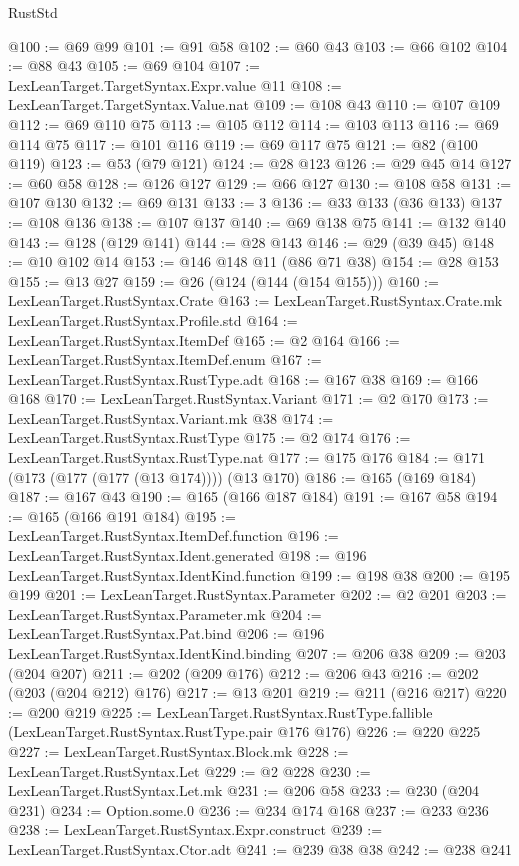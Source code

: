 \begin{lexlean}{RustStd}
\begin{coremodule}
@100 := @69 @99
@101 := @91 @58
@102 := @60 @43
@103 := @66 @102
@104 := @88 @43
@105 := @69 @104
@107 := LexLeanTarget.TargetSyntax.Expr.value @11
@108 := LexLeanTarget.TargetSyntax.Value.nat
@109 := @108 @43
@110 := @107 @109
@112 := @69 @110 @75
@113 := @105 @112
@114 := @103 @113
@116 := @69 @114 @75
@117 := @101 @116
@119 := @69 @117 @75
@121 := @82 (@100 @119)
@123 := @53 (@79 @121)
@124 := @28 @123
@126 := @29 @45 @14
@127 := @60 @58
@128 := @126 @127
@129 := @66 @127
@130 := @108 @58
@131 := @107 @130
@132 := @69 @131
@133 := 3
@136 := @33 @133 (@36 @133)
@137 := @108 @136
@138 := @107 @137
@140 := @69 @138 @75
@141 := @132 @140
@143 := @128 (@129 @141)
@144 := @28 @143
@146 := @29 (@39 @45)
@148 := @10 @102 @14
@153 := @146 @148 @11 (@86 @71 @38)
@154 := @28 @153
@155 := @13 @27
@159 := @26 (@124 (@144 (@154 @155)))
@160 := LexLeanTarget.RustSyntax.Crate
@163 := LexLeanTarget.RustSyntax.Crate.mk LexLeanTarget.RustSyntax.Profile.std
@164 := LexLeanTarget.RustSyntax.ItemDef
@165 := @2 @164
@166 := LexLeanTarget.RustSyntax.ItemDef.enum
@167 := LexLeanTarget.RustSyntax.RustType.adt
@168 := @167 @38
@169 := @166 @168
@170 := LexLeanTarget.RustSyntax.Variant
@171 := @2 @170
@173 := LexLeanTarget.RustSyntax.Variant.mk @38
@174 := LexLeanTarget.RustSyntax.RustType
@175 := @2 @174
@176 := LexLeanTarget.RustSyntax.RustType.nat
@177 := @175 @176
@184 := @171 (@173 (@177 (@177 (@13 @174)))) (@13 @170)
@186 := @165 (@169 @184)
@187 := @167 @43
@190 := @165 (@166 @187 @184)
@191 := @167 @58
@194 := @165 (@166 @191 @184)
@195 := LexLeanTarget.RustSyntax.ItemDef.function
@196 := LexLeanTarget.RustSyntax.Ident.generated
@198 := @196 LexLeanTarget.RustSyntax.IdentKind.function
@199 := @198 @38
@200 := @195 @199
@201 := LexLeanTarget.RustSyntax.Parameter
@202 := @2 @201
@203 := LexLeanTarget.RustSyntax.Parameter.mk
@204 := LexLeanTarget.RustSyntax.Pat.bind
@206 := @196 LexLeanTarget.RustSyntax.IdentKind.binding
@207 := @206 @38
@209 := @203 (@204 @207)
@211 := @202 (@209 @176)
@212 := @206 @43
@216 := @202 (@203 (@204 @212) @176)
@217 := @13 @201
@219 := @211 (@216 @217)
@220 := @200 @219
@225 := LexLeanTarget.RustSyntax.RustType.fallible
    (LexLeanTarget.RustSyntax.RustType.pair @176 @176)
@226 := @220 @225
@227 := LexLeanTarget.RustSyntax.Block.mk
@228 := LexLeanTarget.RustSyntax.Let
@229 := @2 @228
@230 := LexLeanTarget.RustSyntax.Let.mk
@231 := @206 @58
@233 := @230 (@204 @231)
@234 := Option.some.{0}
@236 := @234 @174 @168
@237 := @233 @236
@238 := LexLeanTarget.RustSyntax.Expr.construct
@239 := LexLeanTarget.RustSyntax.Ctor.adt
@241 := @239 @38 @38
@242 := @238 @241

\end{coremodule}
\end{lexlean}
